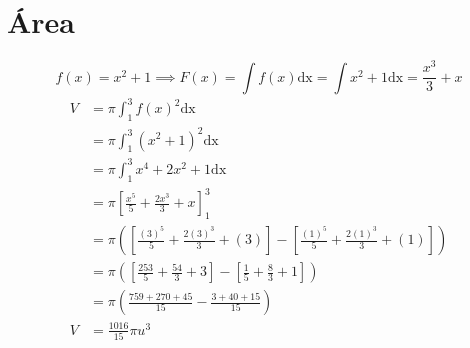 \documentclass{jhwhw}
\newcommand{\dx}{\mathrm{dx}}
\begin{document}
\part{Área}
\[f(x) = x^2+1 \implies F(x) = \int f(x) \dx = \int x^2+1 \dx = \frac{x^3}{3} + x\]
\begin{align*}
    V & = \pi \int_1^3 f(x)^2 \dx                                                                                                        \\
      & = \pi \int_1^3 (x^2+1)^2 \dx                                                                                                     \\
      & = \pi \int_1^3 x^4 + 2x^2 + 1 \dx                                                                                                \\
      & = \pi \left[\frac{x^5}{5} + \frac{2x^3}{3} + x\right]_1^3                                                                        \\
      & = \pi \left(\left[\frac{(3)^5}{5} + \frac{2(3)^3}{3} + (3)\right] - \left[\frac{(1)^5}{5} + \frac{2(1)^3}{3} + (1)\right]\right) \\
      & = \pi \left(\left[\frac{253}{5} + \frac{54}{3} + 3\right] - \left[\frac{1}{5} + \frac{8}{3} + 1\right]\right)                    \\
      & = \pi \left(\frac{759 + 270 + 45}{15} - \frac{3 + 40 + 15}{15}\right)                                                            \\
    V & = \boxed{\frac{1016}{15} \pi u^3}
\end{align*}
\end{document}
